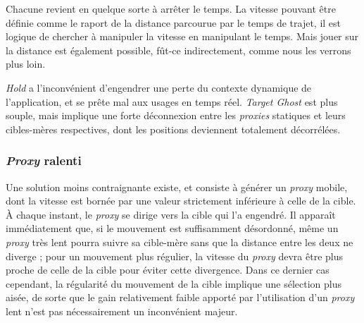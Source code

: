 	Chacune revient en quelque sorte à arrêter le temps. La vitesse pouvant être définie comme le raport de la distance parcourue par le temps de trajet, il est logique de chercher à manipuler la vitesse en manipulant le temps. Mais jouer sur la distance est également possible, fût-ce indirectement, comme nous les verrons plus loin.
	
	\emph{Hold} a l'inconvénient d'engendrer une perte du contexte dynamique de l'application, et se prête mal aux usages en temps réel. \emph{Target Ghost} est plus souple, mais implique une forte déconnexion entre les \emph{proxies} statiques et leurs cibles-mères respectives, dont les positions deviennent totalement décorrélées.
	
	\subsubsection{\emph{Proxy} ralenti}
	Une solution moins contraignante existe, et consiste à générer un \emph{proxy} mobile, dont la vitesse est bornée par une valeur strictement inférieure à celle de la cible. À chaque instant, le \emph{proxy} se dirige vers la cible qui l'a engendré. Il apparaît immédiatement que, si le mouvement est suffisamment désordonné, même un \emph{proxy} très lent pourra suivre sa cible-mère sans que la distance entre les deux ne diverge ; pour un mouvement plus régulier, la vitesse du \emph{proxy} devra être plus proche de celle de la cible pour éviter cette divergence. Dans ce dernier cas cependant, la régularité du mouvement de la cible implique une sélection plus aisée, de sorte que le gain relativement faible apporté par l'utilisation d'un \emph{proxy} lent n'est pas nécessairement un inconvénient majeur.
	
